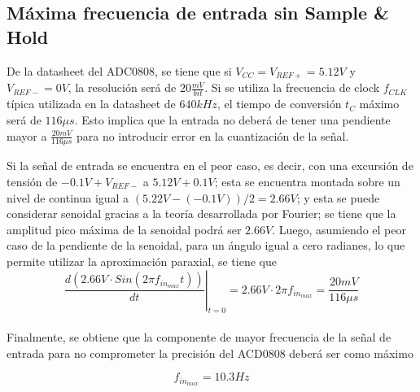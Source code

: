 \subsection{Máxima frecuencia de entrada sin Sample \& Hold}

De la datasheet del ADC0808, se tiene que si $V_{CC} = V_{REF+} = 5.12V$ y $V_{REF-} = 0V$, la resolución será de $20 \frac{mV}{bit}$. Si se utiliza la frecuencia de clock $f_{CLK}$ típica utilizada en la datasheet de $640kHz$, el tiempo de conversión $t_C$ máximo será de $116\mu s$. Esto implica que la entrada no deberá de tener una pendiente mayor a $\frac{20mV}{116\mu s}$ para no introducir error en la cuantización de la señal.


Si la señal de entrada se encuentra en el peor caso, es decir, con una excursión de tensión de $-0.1V + V_{REF-}$ a $5.12V + 0.1V$; esta se encuentra montada sobre un nivel de continua igual a $(5.22V - (-0.1V))/2 = 2.66V$; y esta se puede considerar senoidal gracias a la teoría desarrollada por Fourier; se tiene que la amplitud pico máxima de la senoidal podrá ser $2.66V$. Luego, asumiendo el peor caso de la pendiente de la senoidal, para un ángulo igual a cero radianes, lo que permite utilizar la aproximación paraxial, se tiene que
\\

\begin{equation}
\left. \frac{d \left( 2.66V \cdot Sin \left( 2\pi f_{in_{max}} t \right) \right)}{dt} \right|_{t=0} = 2.66V \cdot 2\pi f_{in_{max}} = \frac{20mV}{116\mu s}
\end{equation}
\\


Finalmente, se obtiene que la componente de mayor frecuencia de la señal de entrada para no comprometer la precisión del ACD0808 deberá ser como máximo

$$f_{in_{max}} = 10.3Hz$$

